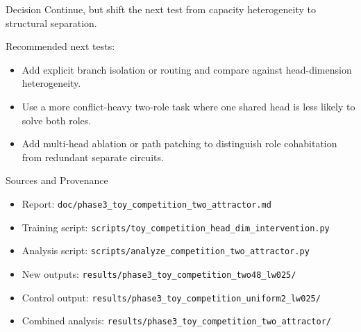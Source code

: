 \documentclass[aspectratio=169]{beamer}
\begin{document}
\begin{frame}{Decision}
  Continue, but shift the next test from capacity heterogeneity to structural separation.

  \vspace{0.8em}
  Recommended next tests:
  \begin{itemize}
    \item Add explicit branch isolation or routing and compare against head-dimension heterogeneity.
    \item Use a more conflict-heavy two-role task where one shared head is less likely to solve both roles.
    \item Add multi-head ablation or path patching to distinguish role cohabitation from redundant separate circuits.
  \end{itemize}
\end{frame}

\begin{frame}{Sources and Provenance}
  \scriptsize
  \begin{itemize}
    \item Report: \texttt{doc/phase3\_toy\_competition\_two\_attractor.md}
    \item Training script: \texttt{scripts/toy\_competition\_head\_dim\_intervention.py}
    \item Analysis script: \texttt{scripts/analyze\_competition\_two\_attractor.py}
    \item New outputs: \texttt{results/phase3\_toy\_competition\_two48\_lw025/}
    \item Control output: \texttt{results/phase3\_toy\_competition\_uniform2\_lw025/}
    \item Combined analysis: \texttt{results/phase3\_toy\_competition\_two\_attractor/}
  \end{itemize}
\end{frame}
\end{document}
